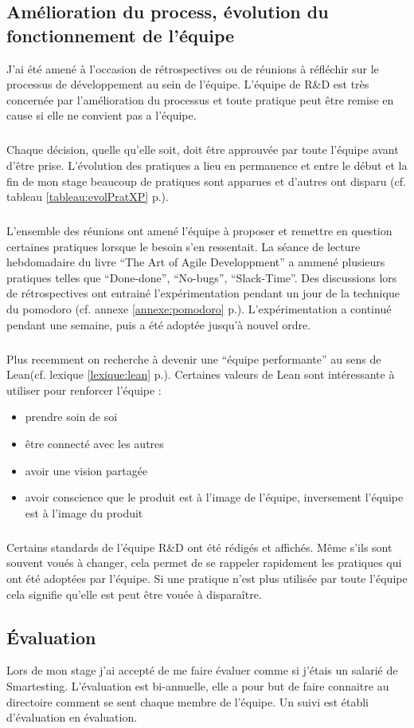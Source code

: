 \subsection{Amélioration du process, évolution du fonctionnement de l'équipe}
J'ai été amené à l'occasion de rétrospectives ou de réunions à réfléchir sur le processus de développement au sein de l'équipe. L'équipe de R\&D est très concernée par l'amélioration du processus et toute pratique peut être remise en cause si elle ne convient pas a l'équipe.
\subparagraph*{}
Chaque décision, quelle qu'elle soit, doit être approuvée par toute l'équipe avant d'être prise. L'évolution des pratiques a lieu en permanence et entre le début et la fin de mon stage beaucoup de pratiques sont apparues et d'autres ont disparu (cf. tableau \ref{tableau:evolPratXP} p.\pageref{tableau:evolPratXP}).
\subparagraph*{}
L'ensemble des réunions ont amené l'équipe à proposer et remettre en question certaines pratiques lorsque le besoin s'en ressentait. La séance de lecture hebdomadaire du livre ``The Art of Agile Developpment'' a ammené plusieurs pratiques telles que ``Done-done'', ``No-bugs'', ``Slack-Time''. Des discussions lors de rétrospectives ont entrainé l'expérimentation pendant un jour de la technique du pomodoro (cf. annexe \ref{annexe:pomodoro} p.\pageref{annexe:pomodoro}). L'expérimentation a continué pendant une semaine, puis a été adoptée jusqu'à nouvel ordre.

\subparagraph*{}
Plus recemment on recherche à devenir une ``équipe performante'' au sens de Lean(cf. lexique \ref{lexique:lean} p.\pageref{lexique:lean}). Certaines valeurs de Lean sont intéressante à utiliser pour renforcer l'équipe :
\begin{itemize}
\item prendre soin de soi
\item être connecté avec les autres
\item avoir une vision partagée
\item avoir conscience que le produit est à l'image de l'équipe, inversement l'équipe est à l'image du produit
\end{itemize}
\subparagraph*{}
Certains standards de l'équipe R\&D ont été rédigés et affichés. Même s'ils sont souvent voués à changer, cela permet de se rappeler rapidement les pratiques qui ont été adoptées par l'équipe. Si une pratique n'est plus utilisée par toute l'équipe cela signifie qu'elle est peut être vouée à disparaître.
\subsection{Évaluation}
Lors de mon stage j'ai accepté de me faire évaluer comme si j'étais un salarié de Smartesting. L'évaluation est bi-annuelle, elle a pour but de faire connaitre au directoire comment se sent chaque membre de l'équipe. Un suivi est établi d'évaluation en évaluation.